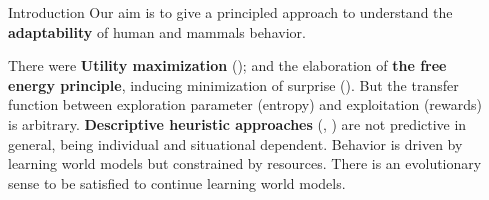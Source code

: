 \documentclass[final]{beamer}
\newlength{\sepwidth}
\newlength{\colwidth}
\newcommand{\separatorcolumn}{\begin{column}{\sepwidth}\end{column}}
\begin{document}
\begin{frame}[t]
\begin{columns}[t]
\separatorcolumn
\begin{column}{\colwidth}
  
  \begin{block}{Introduction}
Our aim is to give a principled approach to understand the \textbf{adaptability} of human and mammals behavior.  
  
There were \textbf{Utility maximization } (\cite{ferrari2021nonhuman});
and the elaboration of \textbf{the free energy principle}, inducing minimization of surprise (\cite{friston2009free}).
But the transfer function between exploration parameter (entropy) and exploitation (rewards) is arbitrary. 
\textbf{Descriptive heuristic approaches} (\cite{gigerenzer2011heuristic}, \cite{newell2005re}) are not predictive in general, being individual and situational dependent.
Behavior is driven by learning world models but constrained by resources. There is an evolutionary sense to be satisfied to continue learning world models. 

  \end{block}
  

\end{column}
\end{columns}
\end{frame}
\end{document}
